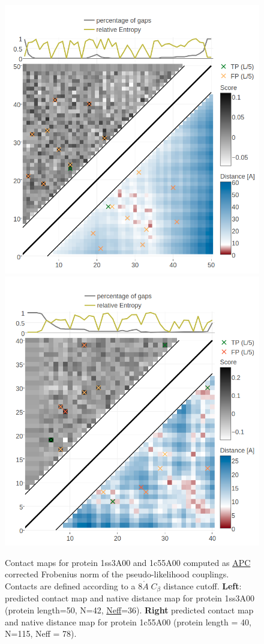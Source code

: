 \documentclass[11pt,a4paper,twoside]{book}
\newcommand{\Cb}{C_\beta}
\newcommand{\angstrom}{\mathring{A} \;}
\theoremstyle{definition}
\theoremstyle{definition}
\theoremstyle{remark}
\begin{document}
\begin{figure}

{\centering \includegraphics[width=0.49\linewidth]{img/full_likelihood/comparing_couplings/1ss3A00/contact_map_pseudo-likelihood_apc_1ss3A00} \includegraphics[width=0.49\linewidth]{img/full_likelihood/comparing_couplings/1c55A00/contact_map_pseudo-likelihood_apc_1c55A00} 

}

\caption{Contact maps for
protein 1ss3A00 and 1c55A00 computed as \protect\hyperlink{abbrev}{APC}
corrected Frobenius norm of the pseudo-likelihood couplings. Contacts
are defined according to a \(8 \angstrom \Cb\) distance cutoff.
\textbf{Left}: predicted contact map and native distance map for protein
1ss3A00 (protein length=50, N=42, \protect\hyperlink{abbrev}{Neff}=36).
\textbf{Right} predicted contact map and native distance map for protein
1c55A00 (protein length = 40, N=115, Neff = 78).}\label{fig:pll-predictions-small-neff-proteins}
\end{figure}
\end{document}
